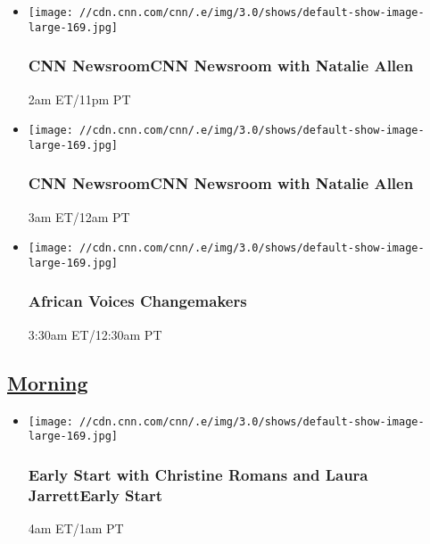 \begin{itemize}
\item
  \texttt{[image: //cdn.cnn.com/cnn/.e/img/3.0/shows/default-show-image-large-169.jpg]}

  \hypertarget{cnn-newsroomcnn-newsroom-with-natalie-allen--5}{%
  \subsubsection{CNN NewsroomCNN Newsroom with Natalie Allen
  }\label{cnn-newsroomcnn-newsroom-with-natalie-allen--5}}

  2am ET/11pm PT
\end{itemize}

\begin{itemize}
\item
  \texttt{[image: //cdn.cnn.com/cnn/.e/img/3.0/shows/default-show-image-large-169.jpg]}

  \hypertarget{cnn-newsroomcnn-newsroom-with-natalie-allen--6}{%
  \subsubsection{CNN NewsroomCNN Newsroom with Natalie Allen
  }\label{cnn-newsroomcnn-newsroom-with-natalie-allen--6}}

  3am ET/12am PT
\end{itemize}

\begin{itemize}
\item
  \texttt{[image: //cdn.cnn.com/cnn/.e/img/3.0/shows/default-show-image-large-169.jpg]}

  \hypertarget{african-voices-changemakers-6}{%
  \subsubsection{African Voices
  Changemakers}\label{african-voices-changemakers-6}}

  3:30am ET/12:30am PT
\end{itemize}

\hypertarget{morning--6}{%
\subsection{\texorpdfstring{\href{/tv/schedule/cnn/index.html}{Morning}~}{Morning~}}\label{morning--6}}

\begin{itemize}
\item
  \texttt{[image: //cdn.cnn.com/cnn/.e/img/3.0/shows/default-show-image-large-169.jpg]}

  \hypertarget{early-start-with-christine-romans-and-laura-jarrettearly-start--4}{%
  \subsubsection{Early Start with Christine Romans and Laura
  JarrettEarly Start
  }\label{early-start-with-christine-romans-and-laura-jarrettearly-start--4}}

  4am ET/1am PT
\end{itemize}

